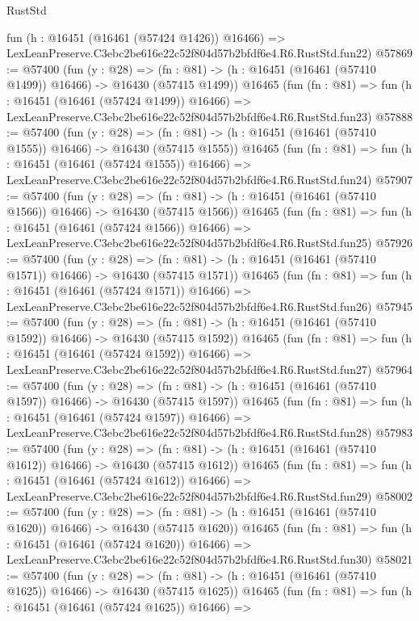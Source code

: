 \begin{lexlean}{RustStd}
\begin{coremodule}
    fun (h : @16451 (@16461 (@57424 @1426)) @16466) =>
    LexLeanPreserve.C3ebc2be616e22c52f804d57b2bfdf6e4.R6.RustStd.fun22)
@57869 := @57400
    (fun (y : @28) =>
    (fn : @81) -> (h : @16451 (@16461 (@57410 @1499)) @16466) -> @16430 (@57415 @1499))
    @16465
    (fun (fn : @81) =>
    fun (h : @16451 (@16461 (@57424 @1499)) @16466) =>
    LexLeanPreserve.C3ebc2be616e22c52f804d57b2bfdf6e4.R6.RustStd.fun23)
@57888 := @57400
    (fun (y : @28) =>
    (fn : @81) -> (h : @16451 (@16461 (@57410 @1555)) @16466) -> @16430 (@57415 @1555))
    @16465
    (fun (fn : @81) =>
    fun (h : @16451 (@16461 (@57424 @1555)) @16466) =>
    LexLeanPreserve.C3ebc2be616e22c52f804d57b2bfdf6e4.R6.RustStd.fun24)
@57907 := @57400
    (fun (y : @28) =>
    (fn : @81) -> (h : @16451 (@16461 (@57410 @1566)) @16466) -> @16430 (@57415 @1566))
    @16465
    (fun (fn : @81) =>
    fun (h : @16451 (@16461 (@57424 @1566)) @16466) =>
    LexLeanPreserve.C3ebc2be616e22c52f804d57b2bfdf6e4.R6.RustStd.fun25)
@57926 := @57400
    (fun (y : @28) =>
    (fn : @81) -> (h : @16451 (@16461 (@57410 @1571)) @16466) -> @16430 (@57415 @1571))
    @16465
    (fun (fn : @81) =>
    fun (h : @16451 (@16461 (@57424 @1571)) @16466) =>
    LexLeanPreserve.C3ebc2be616e22c52f804d57b2bfdf6e4.R6.RustStd.fun26)
@57945 := @57400
    (fun (y : @28) =>
    (fn : @81) -> (h : @16451 (@16461 (@57410 @1592)) @16466) -> @16430 (@57415 @1592))
    @16465
    (fun (fn : @81) =>
    fun (h : @16451 (@16461 (@57424 @1592)) @16466) =>
    LexLeanPreserve.C3ebc2be616e22c52f804d57b2bfdf6e4.R6.RustStd.fun27)
@57964 := @57400
    (fun (y : @28) =>
    (fn : @81) -> (h : @16451 (@16461 (@57410 @1597)) @16466) -> @16430 (@57415 @1597))
    @16465
    (fun (fn : @81) =>
    fun (h : @16451 (@16461 (@57424 @1597)) @16466) =>
    LexLeanPreserve.C3ebc2be616e22c52f804d57b2bfdf6e4.R6.RustStd.fun28)
@57983 := @57400
    (fun (y : @28) =>
    (fn : @81) -> (h : @16451 (@16461 (@57410 @1612)) @16466) -> @16430 (@57415 @1612))
    @16465
    (fun (fn : @81) =>
    fun (h : @16451 (@16461 (@57424 @1612)) @16466) =>
    LexLeanPreserve.C3ebc2be616e22c52f804d57b2bfdf6e4.R6.RustStd.fun29)
@58002 := @57400
    (fun (y : @28) =>
    (fn : @81) -> (h : @16451 (@16461 (@57410 @1620)) @16466) -> @16430 (@57415 @1620))
    @16465
    (fun (fn : @81) =>
    fun (h : @16451 (@16461 (@57424 @1620)) @16466) =>
    LexLeanPreserve.C3ebc2be616e22c52f804d57b2bfdf6e4.R6.RustStd.fun30)
@58021 := @57400
    (fun (y : @28) =>
    (fn : @81) -> (h : @16451 (@16461 (@57410 @1625)) @16466) -> @16430 (@57415 @1625))
    @16465
    (fun (fn : @81) =>
    fun (h : @16451 (@16461 (@57424 @1625)) @16466) =>

\end{coremodule}
\end{lexlean}
